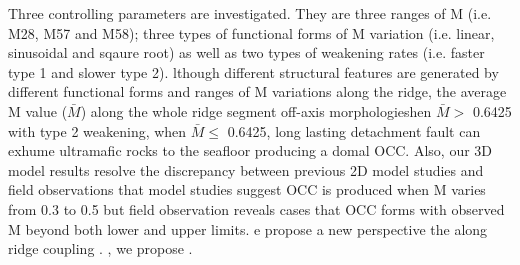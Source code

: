 Three controlling parameters are investigated. They are three ranges of M (i.e. M28, M57 and M58); three types of functional forms of M variation (i.e. linear, sinusoidal and sqaure root) as well as two types of weakening rates (i.e. faster type 1 and slower type 2). lthough different structural features are generated by different functional forms and ranges of M variations along the ridge, the average M value ($\bar{M}$) along the whole ridge segment  off-axis morphologieshen $\bar{M} >$ 0.6425 with type 2 weakening,   when $\bar{M} \le$ 0.6425,   long lasting detachment fault   can exhume ultramafic rocks to the seafloor producing a domal OCC. Also, our 3D model results resolve the discrepancy between previous 2D model studies and field observations that model studies suggest OCC is produced when M varies from 0.3 to 0.5 but field observation reveals cases that OCC forms with observed M beyond both lower and upper limits. e propose a new perspective  the along ridge coupling . , we propose .




